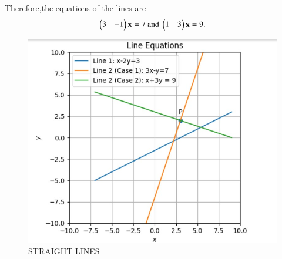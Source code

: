Therefore,the equations of the lines are 
\begin{align}
	\begin{pmatrix}3 & -1\end{pmatrix}\mathbf{x} = 7  \text{ and }   \begin{pmatrix}1 & 3\end{pmatrix}\mathbf{x} = 9 .
\end{align}
\begin{figure}[H]
\centering
\includegraphics[width=\columnwidth]{figs/strline.jpg}
\caption{STRAIGHT LINES}
\label{fig:strline.jpg}
\end{figure}




%
